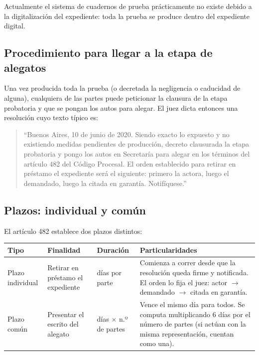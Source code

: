 \documentclass[12pt,oneside]{book}
\begin{document}
Actualmente el sistema de cuadernos de prueba prácticamente no existe debido a la digitalización del expediente: toda la prueba se produce dentro del expediente digital.

\subsection{Procedimiento para llegar a la etapa de alegatos}

Una vez producida toda la prueba (o decretada la negligencia o caducidad de alguna), cualquiera de las partes puede peticionar la clausura de la etapa probatoria y que se pongan los autos para alegar. El juez dicta entonces una resolución cuyo texto típico es:

\begin{quote}
``Buenos Aires, 10 de junio de 2020. Siendo exacto lo expuesto y no existiendo medidas pendientes de producción, decreto clausurada la etapa probatoria y pongo los autos en Secretaría para alegar en los términos del artículo 482 del Código Procesal. El orden establecido para retirar en préstamo el expediente será el siguiente: primero la actora, luego el demandado, luego la citada en garantía. Notifíquese.''
\end{quote}

\subsection{Plazos: individual y común}

El artículo 482 establece dos plazos distintos:

\begin{table}[H]
\centering
\begin{tabularx}{\textwidth}{>{\raggedright\arraybackslash}p{2.3cm} >{\raggedright\arraybackslash}p{2.6cm} >{\raggedright\arraybackslash}p{2.6cm} >{\raggedright\arraybackslash}X}
\toprule
\textbf{Tipo} & \textbf{Finalidad} & \textbf{Duración} & \textbf{Particularidades} \\
\midrule
Plazo individual & Retirar en préstamo el expediente & 6 días por parte & Comienza a correr desde que la resolución queda firme y notificada. El orden lo fija el juez: actor $\rightarrow$ demandado $\rightarrow$ citada en garantía. \\
\addlinespace
Plazo común & Presentar el escrito del alegato & 6 días $\times$ n.º de partes & Vence el mismo día para todos. Se computa multiplicando 6 días por el número de partes (si actúan con la misma representación, cuentan como una). \\
\bottomrule
\end{tabularx}
\end{table}
\end{document}
